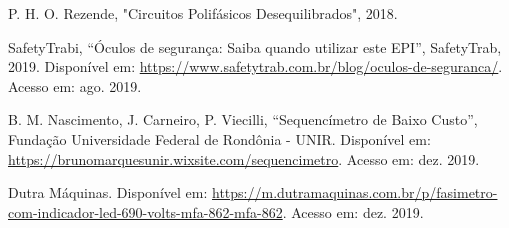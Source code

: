 \documentclass[a4paper,12pt,oneside,openany,table,xcdraw]{article}
\begin{document}
\newpage
\begin{thebibliography}{9} 
    P. H. O. Rezende,
    "Circuitos Polifásicos Desequilibrados", 2018.

    SafetyTrabi,
    “Óculos de segurança: Saiba quando utilizar este EPI”, SafetyTrab, 2019.
 Disponível em:
 \url{https://www.safetytrab.com.br/blog/oculos-de-seguranca/}. Acesso em: ago. 2019.

    B. M. Nascimento, J. Carneiro, P. Viecilli,
    “Sequencímetro de Baixo Custo”, Fundação Universidade Federal de Rondônia - UNIR.
 Disponível em:
 \url{https://brunomarquesunir.wixsite.com/sequencimetro}. Acesso em: dez. 2019.

    Dutra Máquinas.
 Disponível em:
 \url{https://m.dutramaquinas.com.br/p/fasimetro-com-indicador-led-690-volts-mfa-862-mfa-862}. Acesso em: dez. 2019.


\end{thebibliography}
\end{document}
